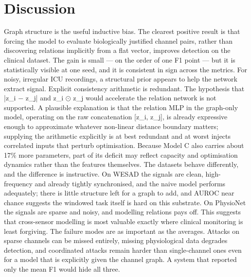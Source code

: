 \documentclass[conference]{IEEEtran}
\begin{document}
\section{Discussion}
Graph structure is the useful inductive bias. The clearest positive result is that forcing the model to evaluate biologically justified channel pairs, rather than discovering relations implicitly from a flat vector, improves detection on the clinical dataset. The gain is small --- on the order of one F1 point --- but it is statistically visible at one seed, and it is consistent in sign across the metrics. For noisy, irregular ICU recordings, a structural prior appears to help the network extract signal.
Explicit consistency arithmetic is redundant. The hypothesis that |z\_i $-$ z\_j| and z\_i $\odot$ z\_j would accelerate the relation network is not supported. A plausible explanation is that the relation MLP in the graph-only model, operating on the raw concatenation [z\_i, z\_j], is already expressive enough to approximate whatever non-linear distance boundary matters; supplying the arithmetic explicitly is at best redundant and at worst injects correlated inputs that perturb optimisation. Because Model C also carries about 17\% more parameters, part of its deficit may reflect capacity and optimisation dynamics rather than the features themselves.
The datasets behave differently, and the difference is instructive. On WESAD the signals are clean, high-frequency and already tightly synchronised, and the naive model performs adequately; there is little structure left for a graph to add, and AUROC near chance suggests the windowed task itself is hard on this substrate. On PhysioNet the signals are sparse and noisy, and modelling relations pays off. This suggests that cross-sensor modelling is most valuable exactly where clinical monitoring is least forgiving.
The failure modes are as important as the averages. Attacks on sparse channels can be missed entirely, missing physiological data degrades detection, and coordinated attacks remain harder than single-channel ones even for a model that is explicitly given the channel graph. A system that reported only the mean F1 would hide all three.
\end{document}
